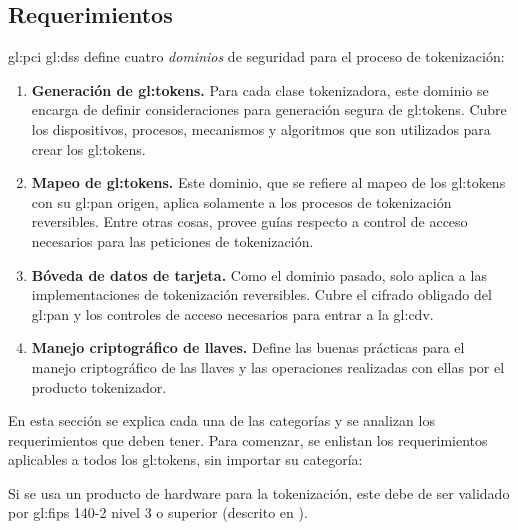 %
%

\subsection{Requerimientos}
\label{sec:requerimientos}

\gls{gl:pci} \gls{gl:dss} define cuatro \textit{dominios} de seguridad para el
proceso de tokenización:

\begin{enumerate}

  \item \label{dm:gen_tokens} \textbf{Generación de \glspl{gl:token}.}
    Para cada clase tokenizadora, este dominio se encarga de definir
    consideraciones para generación segura de \glspl{gl:token}. Cubre los
    dispositivos, procesos, mecanismos y algoritmos que son utilizados para
    crear los \glspl{gl:token}.

  \item \label{dm:mapeo_tokens} \textbf{Mapeo de \glspl{gl:token}.}
    Este dominio, que se refiere al mapeo de los \glspl{gl:token} con su
    \gls{gl:pan} origen, aplica solamente a los procesos de tokenización
    reversibles. Entre otras cosas, provee guías respecto a control de acceso
    necesarios para las peticiones de tokenización.

  \item \label{dm:card_data} \textbf{Bóveda de datos de tarjeta.}
    Como el dominio pasado, solo aplica a las implementaciones de tokenización
    reversibles. Cubre el cifrado obligado del \gls{gl:pan} y los controles de
    acceso necesarios para entrar a la \gls{gl:cdv}.

  \item \label{dm:man_llaves} \textbf{Manejo criptográfico de llaves.}
    Define las buenas prácticas para el manejo criptográfico de las llaves y
    las operaciones realizadas con ellas por el producto tokenizador.

\end{enumerate}

En esta sección se explica cada una de las categorías y se analizan los
requerimientos que deben tener. Para comenzar, se enlistan los requerimientos
aplicables a todos los \glspl{gl:token}, sin importar su categoría:

{
  Si se usa un producto de hardware para la tokenización, este debe de ser
  validado por \gls{gl:fips} 140-2 nivel 3 o superior (descrito en
  \cite{nist_modulos_criptograficos}).
}

